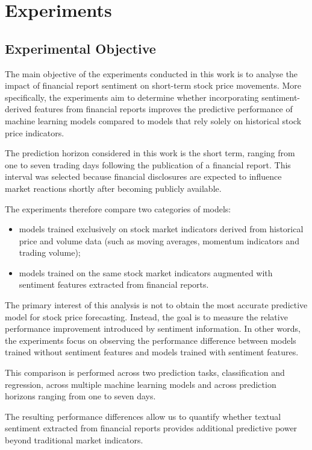 \chapter{Experiments}

\section{Experimental Objective}

The main objective of the experiments conducted in this work is to analyse the impact of financial report sentiment on short-term stock price movements. More specifically, the experiments aim to determine whether incorporating sentiment-derived features from financial reports improves the predictive performance of machine learning models compared to models that rely solely on historical stock price indicators.

The prediction horizon considered in this work is the short term, ranging from one to seven trading days following the publication of a financial report. This interval was selected because financial disclosures are expected to influence market reactions shortly after becoming publicly available.

The experiments therefore compare two categories of models:

\begin{itemize}
\item models trained exclusively on stock market indicators derived from historical price and volume data (such as moving averages, momentum indicators and trading volume);
\item models trained on the same stock market indicators augmented with sentiment features extracted from financial reports.
\end{itemize}

The primary interest of this analysis is not to obtain the most accurate predictive model for stock price forecasting. Instead, the goal is to measure the relative performance improvement introduced by sentiment information. In other words, the experiments focus on observing the performance difference between models trained without sentiment features and models trained with sentiment features.

This comparison is performed across two prediction tasks, classification and regression, across multiple machine learning models and across prediction horizons ranging from one to seven days.

The resulting performance differences allow us to quantify whether textual sentiment extracted from financial reports provides additional predictive power beyond traditional market indicators.


